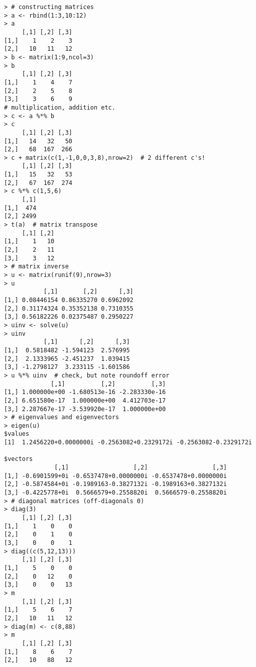 \begin{lstlisting}
> # constructing matrices
> a <- rbind(1:3,10:12)
> a
     [,1] [,2] [,3]
[1,]    1    2    3
[2,]   10   11   12
> b <- matrix(1:9,ncol=3)  
> b
     [,1] [,2] [,3]
[1,]    1    4    7
[2,]    2    5    8
[3,]    3    6    9
# multiplication, addition etc.
> c <- a %*% b
> c
     [,1] [,2] [,3]
[1,]   14   32   50
[2,]   68  167  266
> c + matrix(c(1,-1,0,0,3,8),nrow=2)  # 2 different c's!
     [,1] [,2] [,3]
[1,]   15   32   53
[2,]   67  167  274
> c %*% c(1,5,6)  
     [,1]
[1,]  474
[2,] 2499
> t(a)  # matrix transpose
     [,1] [,2]
[1,]    1   10
[2,]    2   11
[3,]    3   12
> # matrix inverse
> u <- matrix(runif(9),nrow=3)
> u
           [,1]       [,2]      [,3]
[1,] 0.08446154 0.86335270 0.6962092
[2,] 0.31174324 0.35352138 0.7310355
[3,] 0.56182226 0.02375487 0.2950227
> uinv <- solve(u)
> uinv
           [,1]      [,2]      [,3]
[1,]  0.5818482 -1.594123  2.576995
[2,]  2.1333965 -2.451237  1.039415
[3,] -1.2798127  3.233115 -1.601586
> u %*% uinv  # check, but note roundoff error
             [,1]          [,2]          [,3]
[1,] 1.000000e+00 -1.680513e-16 -2.283330e-16
[2,] 6.651580e-17  1.000000e+00  4.412703e-17
[3,] 2.287667e-17 -3.539920e-17  1.000000e+00
> # eigenvalues and eigenvectors
> eigen(u)
$values
[1]  1.2456220+0.0000000i -0.2563082+0.2329172i -0.2563082-0.2329172i

$vectors
              [,1]                  [,2]                  [,3]
[1,] -0.6901599+0i -0.6537478+0.0000000i -0.6537478+0.0000000i
[2,] -0.5874584+0i -0.1989163-0.3827132i -0.1989163+0.3827132i
[3,] -0.4225778+0i  0.5666579+0.2558820i  0.5666579-0.2558820i
> # diagonal matrices (off-diagonals 0)
> diag(3)
     [,1] [,2] [,3]
[1,]    1    0    0
[2,]    0    1    0
[3,]    0    0    1
> diag((c(5,12,13)))
     [,1] [,2] [,3]
[1,]    5    0    0
[2,]    0   12    0
[3,]    0    0   13
> m
     [,1] [,2] [,3]
[1,]    5    6    7
[2,]   10   11   12
> diag(m) <- c(8,88)
> m
     [,1] [,2] [,3]
[1,]    8    6    7
[2,]   10   88   12
\end{lstlisting}

